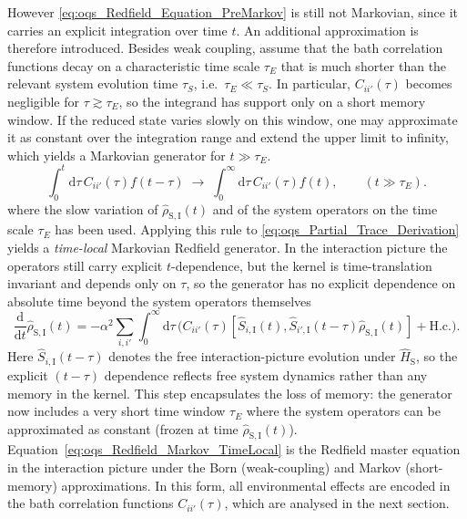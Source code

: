 However \autoref{eq:oqs_Redfield_Equation_PreMarkov} is still not Markovian, since it carries an explicit integration over time $t$.
An additional approximation is therefore introduced. Besides weak coupling, assume that the bath correlation functions decay on a characteristic time scale $\tau_E$ that is much shorter than the relevant system evolution time $\tau_S$, i.e.\ $\tau_E \ll \tau_S$. In particular, $C_{ii'}(\tau)$ becomes negligible for $\tau \gtrsim \tau_E$, so the integrand has support only on a short memory window. If the reduced state varies slowly on this window, one may approximate it as constant over the integration range and extend the upper limit to infinity, which yields a Markovian generator for $t \gg \tau_E$.
\begin{equation*}
	\int_0^t\!\mathrm{d}\tau\, C_{ii'}(\tau) f(t-\tau)
	\; \longrightarrow \;
	\int_0^{\infty}\!\mathrm{d}\tau\, C_{ii'}(\tau) f(t),
	\qquad (t \gg \tau_E).
\end{equation*}
where the slow variation of $\hat{\rho}_{\mathrm{S},\mathrm{I}}(t)$ and of the system operators on the time scale $\tau_E$ has been used.
Applying this rule to \autoref{eq:oqs_Partial_Trace_Derivation} yields a \emph{time-local} Markovian Redfield generator. In the interaction picture the operators still carry explicit $t$-dependence, but the kernel is time-translation invariant and depends only on $\tau$, so the generator has no explicit dependence on absolute time beyond the system operators themselves
\begin{equation}
		\frac{\mathrm{d}}{\mathrm{d}t}\hat{\rho}_{\mathrm{S},\mathrm{I}}(t) = - \alpha^2 \sum_{i,i'} \int_0^{\infty}\!\mathrm{d}\tau \, \Big( C_{ii'}(\tau) [\hat{S}_{i,\mathrm{I}}(t), \hat{S}_{i',\mathrm{I}}(t-\tau) \hat{\rho}_{\mathrm{S},\mathrm{I}}(t)] + \text{H.c.}\Big).
	\label{eq:oqs_Redfield_Markov_TimeLocal}
\end{equation}
Here $\hat{S}_{i,\mathrm{I}}(t-\tau)$ denotes the free interaction-picture evolution under $\hat{H}_{\mathrm{S}}$, so the explicit $(t-\tau)$ dependence reflects free system dynamics rather than any memory in the kernel.
This step encapsulates the loss of memory: the generator now includes a very short time window $\tau_E$ where the system operators can be approximated as constant (frozen at time $\hat{\rho}_{\mathrm{S},\mathrm{I}}(t)$).
Equation~\autoref{eq:oqs_Redfield_Markov_TimeLocal} is the Redfield master equation in the interaction picture under the Born (weak-coupling) and Markov (short-memory) approximations. In this form, all environmental effects are encoded in the bath correlation functions $C_{ii'}(\tau)$, which are analysed in the next section.


